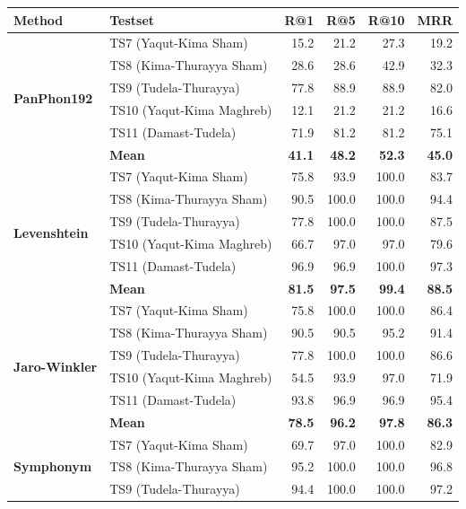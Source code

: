 \documentclass[11pt,a4paper]{article}
\begin{document}
\begin{table}[p]
\centering
\small
\begin{tabular}{llrrrr}
\toprule
\textbf{Method} & \textbf{Testset} & \textbf{R@1} & \textbf{R@5} & \textbf{R@10} & \textbf{MRR} \\
\midrule
\multirow{6}{*}{\textbf{PanPhon192}}
& TS7 (Yaqut-Kima Sham) & 15.2 & 21.2 & 27.3 & 19.2 \\
& TS8 (Kima-Thurayya Sham) & 28.6 & 28.6 & 42.9 & 32.3 \\
& TS9 (Tudela-Thurayya) & 77.8 & 88.9 & 88.9 & 82.0 \\
& TS10 (Yaqut-Kima Maghreb) & 12.1 & 21.2 & 21.2 & 16.6 \\
& TS11 (Damast-Tudela) & 71.9 & 81.2 & 81.2 & 75.1 \\
\cmidrule{2-6}
& \textbf{Mean} & \textbf{41.1} & \textbf{48.2} & \textbf{52.3} & \textbf{45.0} \\
\midrule
\multirow{6}{*}{\textbf{Levenshtein}}
& TS7 (Yaqut-Kima Sham) & 75.8 & 93.9 & 100.0 & 83.7 \\
& TS8 (Kima-Thurayya Sham) & 90.5 & 100.0 & 100.0 & 94.4 \\
& TS9 (Tudela-Thurayya) & 77.8 & 100.0 & 100.0 & 87.5 \\
& TS10 (Yaqut-Kima Maghreb) & 66.7 & 97.0 & 97.0 & 79.6 \\
& TS11 (Damast-Tudela) & 96.9 & 96.9 & 100.0 & 97.3 \\
\cmidrule{2-6}
& \textbf{Mean} & \textbf{81.5} & \textbf{97.5} & \textbf{99.4} & \textbf{88.5} \\
\midrule
\multirow{6}{*}{\textbf{Jaro-Winkler}}
& TS7 (Yaqut-Kima Sham) & 75.8 & 100.0 & 100.0 & 86.4 \\
& TS8 (Kima-Thurayya Sham) & 90.5 & 90.5 & 95.2 & 91.4 \\
& TS9 (Tudela-Thurayya) & 77.8 & 100.0 & 100.0 & 86.6 \\
& TS10 (Yaqut-Kima Maghreb) & 54.5 & 93.9 & 97.0 & 71.9 \\
& TS11 (Damast-Tudela) & 93.8 & 96.9 & 96.9 & 95.4 \\
\cmidrule{2-6}
& \textbf{Mean} & \textbf{78.5} & \textbf{96.2} & \textbf{97.8} & \textbf{86.3} \\
\midrule
\multirow{6}{*}{\textbf{Symphonym}}
& TS7 (Yaqut-Kima Sham) & 69.7 & 97.0 & 100.0 & 82.9 \\
& TS8 (Kima-Thurayya Sham) & 95.2 & 100.0 & 100.0 & 96.8 \\
& TS9 (Tudela-Thurayya) & 94.4 & 100.0 & 100.0 & 97.2 \\

\end{tabular}
\end{table}
\end{document}
